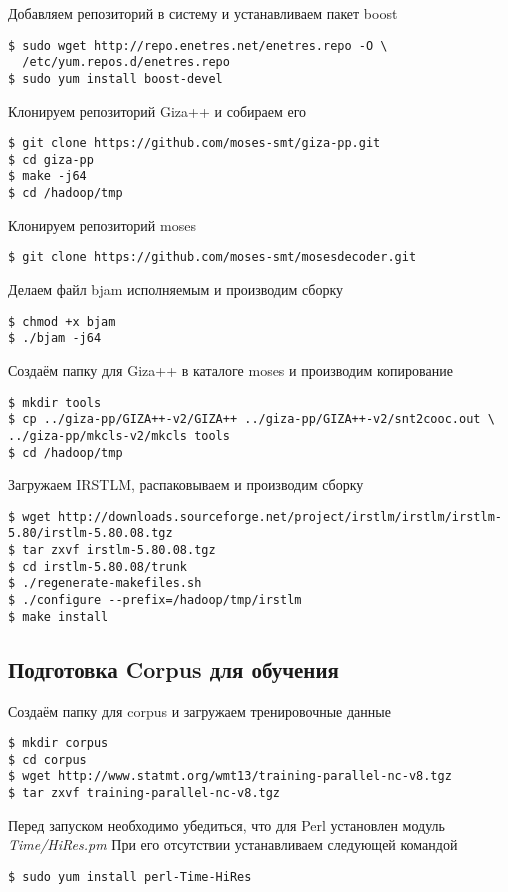 Добавляем репозиторий в систему и устанавливаем пакет boost
\begin{lstlisting}
$ sudo wget http://repo.enetres.net/enetres.repo -O \
  /etc/yum.repos.d/enetres.repo
$ sudo yum install boost-devel
\end{lstlisting}

Клонируем репозиторий Giza++ и собираем его
\begin{lstlisting}
$ git clone https://github.com/moses-smt/giza-pp.git
$ cd giza-pp
$ make -j64
$ cd /hadoop/tmp
\end{lstlisting}

Клонируем репозиторий moses
\begin{lstlisting}
$ git clone https://github.com/moses-smt/mosesdecoder.git
\end{lstlisting}
Делаем файл bjam исполняемым и производим сборку
\begin{lstlisting}
$ chmod +x bjam
$ ./bjam -j64
\end{lstlisting}

Создаём папку для Giza++ в каталоге moses и производим копирование
\begin{lstlisting}
$ mkdir tools
$ cp ../giza-pp/GIZA++-v2/GIZA++ ../giza-pp/GIZA++-v2/snt2cooc.out \
../giza-pp/mkcls-v2/mkcls tools
$ cd /hadoop/tmp
\end{lstlisting}

Загружаем IRSTLM, распаковываем и производим сборку
\begin{lstlisting}
$ wget http://downloads.sourceforge.net/project/irstlm/irstlm/irstlm-5.80/irstlm-5.80.08.tgz
$ tar zxvf irstlm-5.80.08.tgz
$ cd irstlm-5.80.08/trunk
$ ./regenerate-makefiles.sh
$ ./configure --prefix=/hadoop/tmp/irstlm
$ make install
\end{lstlisting}

\subsection{Подготовка Corpus для обучения}
Создаём папку для corpus и загружаем тренировочные данные
\begin{lstlisting}
$ mkdir corpus
$ cd corpus
$ wget http://www.statmt.org/wmt13/training-parallel-nc-v8.tgz
$ tar zxvf training-parallel-nc-v8.tgz
\end{lstlisting}

Перед запуском необходимо убедиться, что для Perl установлен модуль \emph{Time/HiRes.pm}
При его отсутствии устанавливаем следующей командой
\begin{lstlisting}
$ sudo yum install perl-Time-HiRes
\end{lstlisting}

